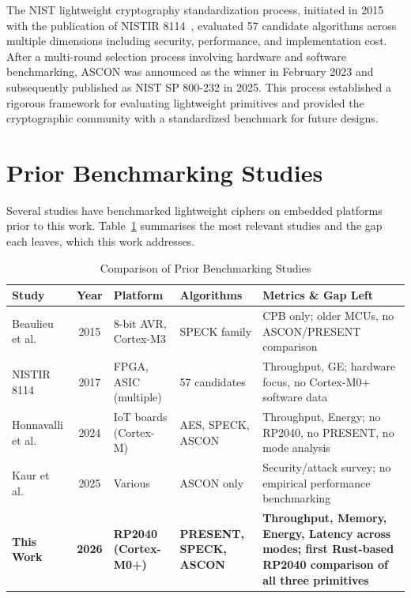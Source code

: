 \documentclass[12pt]{report}
\begin{document}
The NIST lightweight cryptography standardization process, initiated in
2015 with the publication of NISTIR 8114~\cite{mckay2017nist}, evaluated
57 candidate algorithms across multiple dimensions including security,
performance, and implementation cost. After a multi-round selection
process involving hardware and software benchmarking, ASCON was announced
as the winner in February 2023 and subsequently published as NIST SP
800-232 in 2025. This process established a rigorous framework for
evaluating lightweight primitives and provided the cryptographic
community with a standardized benchmark for future designs.

\section{Prior Benchmarking Studies}

Several studies have benchmarked lightweight ciphers on embedded platforms
prior to this work. Table~\ref{tab:prior-work-comparison} summarises the
most relevant studies and the gap each leaves, which this work addresses.

\begin{table}[h!]
    \centering
    \caption{Comparison of Prior Benchmarking Studies}
    \label{tab:prior-work-comparison}
    \footnotesize
    \renewcommand{\arraystretch}{1.25}
    \begin{tabularx}{\textwidth}{@{}
        >{\raggedright}p{2.5cm}
        c
        >{\raggedright}p{2.4cm}
        >{\raggedright}p{2.5cm}
        >{\raggedright\arraybackslash}X
    @{}}
        \toprule
        \textbf{Study} & \textbf{Year} & \textbf{Platform} &
        \textbf{Algorithms} & \textbf{Metrics \& Gap Left} \\
        \midrule
        Beaulieu et al.~\cite{beaulieu2015simon}
            & 2015 & 8-bit AVR, Cortex-M3
            & SPECK family
            & CPB only; older MCUs, no ASCON/PRESENT comparison \\
        NISTIR 8114~\cite{mckay2017nist}
            & 2017 & FPGA, ASIC (multiple)
            & 57 candidates
            & Throughput, GE; hardware focus, no Cortex-M0+ software data \\
        Honnavalli et al.~\cite{honnavalli2024}
            & 2024 & IoT boards (Cortex-M)
            & AES, SPECK, ASCON
            & Throughput, Energy; no RP2040, no PRESENT, no mode analysis \\
        Kaur et al.~\cite{kaur2024}
            & 2025 & Various
            & ASCON only
            & Security/attack survey; no empirical performance benchmarking \\
        \midrule
        \textbf{This Work}
            & \textbf{2026} & \textbf{RP2040 (Cortex-M0+)}
            & \textbf{PRESENT, SPECK, ASCON}
            & \textbf{Throughput, Memory, Energy, Latency across modes; first Rust-based RP2040 comparison of all three primitives} \\
        \bottomrule
    \end{tabularx}
\end{table}
\end{document}
